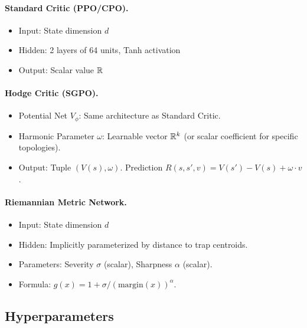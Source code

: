 \paragraph{Standard Critic (PPO/CPO).}
\begin{itemize}
    \item Input: State dimension $d$
    \item Hidden: 2 layers of 64 units, Tanh activation
    \item Output: Scalar value $\mathbb{R}$
\end{itemize}

\paragraph{Hodge Critic (SGPO).}
\begin{itemize}
    \item Potential Net $V_\phi$: Same architecture as Standard Critic.
    \item Harmonic Parameter $\omega$: Learnable vector $\mathbb{R}^k$ (or scalar coefficient for specific topologies).
    \item Output: Tuple $(V(s), \omega)$. Prediction $R(s,s',v) = V(s') - V(s) + \omega \cdot v$.
\end{itemize}

\paragraph{Riemannian Metric Network.}
\begin{itemize}
    \item Input: State dimension $d$
    \item Hidden: Implicitly parameterized by distance to trap centroids.
    \item Parameters: Severity $\sigma$ (scalar), Sharpness $\alpha$ (scalar).
    \item Formula: $g(x) = 1 + \sigma / (\text{margin}(x))^\alpha$.
\end{itemize}

\subsection{Hyperparameters}

